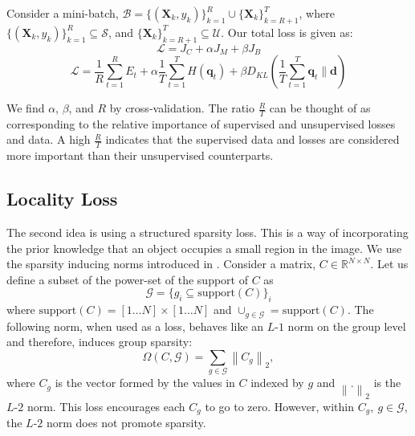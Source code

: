 Consider a mini-batch, $\mathcal{B} =
\{(\mathbf{X}_k, y_k)\}_{k=1}^R \cup \{\mathbf{X}_k\}_{k=R+1}^T$, where $\{(\mathbf{X}_k,
y_k)\}_{k=1}^{R} \subseteq \mathcal{S}$, and $\{\mathbf{X}_k\}_{k=R+1}^{T} \subseteq \mathcal{U}$. Our total loss
is given as:
\begin{equation}
	\mathcal{L} = J_C + \alpha J_M + \beta J_B
\end{equation}
\begin{equation}
	\mathcal{L} = \frac{1}{R} \sum_{t=1}^{R} E_t + \alpha \frac{1}{T}\sum_{t=1}^{T}H(\mathbf{q}_t) +
	\beta D_{KL}(\frac{1}{T}\sum_{t=1}^{T}\mathbf{q}_t \lVert \mathbf{d})
\end{equation}


We find $\alpha$, $\beta$, and $R$ by cross-validation. The ratio $\frac{R}{T}$ can be thought of as
corresponding to the relative importance of supervised and unsupervised losses and data. A high
$\frac{R}{T}$ indicates that the supervised data and losses are considered more important than their
unsupervised counterparts. 


\subsection{Locality Loss}
The second idea is using a structured sparsity loss. This is a way of incorporating the prior knowledge
that an object occupies a small region in the image. We use the sparsity inducing norms introduced in
\cite{groupsparsity,sparsepca}. Consider a matrix, $C \in \mathbb{R}^{N \times
N}$. Let us define a subset of the power-set of the support of $C$ as
\begin{equation}
	\mathcal{G} = \{g_i \subseteq \textrm{support}(C)\}_i
\end{equation}
where $\textrm{support}(C) = [1 \dots N] \times [1 \dots N]$ and $\cup_{g \in \mathcal{G}} = \textrm{support}(C)$. The following norm, when used as a
loss, behaves like an $L$-$1$ norm on the group level and therefore, induces group sparsity:
\begin{equation}
	\Omega (C, \mathcal{G}) = \sum_{g \in \mathcal{G}} \left\lVert C_g \right\rVert _2,
\end{equation}
where $C_g$ is the vector formed by the values in $C$ indexed by $g$ and $\left\lVert . \right\rVert_2$ is
the $L$-$2$ norm. This loss encourages each $C_g$ to go to zero. However, within $C_g,~g
\in \mathcal{G}$, the $L$-$2$ norm does not promote sparsity.

